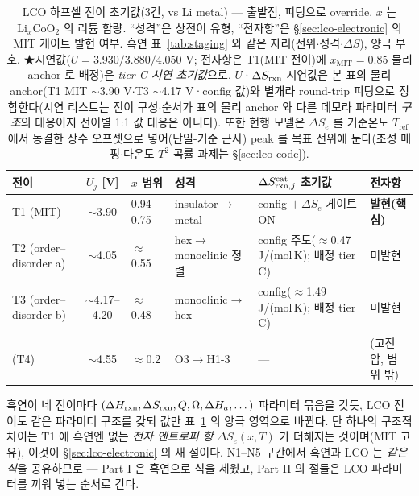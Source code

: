 \begin{table}[t]
\centering\footnotesize
\renewcommand{\arraystretch}{1.3}
\caption{LCO 하프셀 전이 초기값(3건, vs Li metal) --- 출발점, 피팅으로 override. $x$ 는
$\mathrm{Li}_x\mathrm{CoO_2}$ 의 리튬 함량. ``성격''은 상전이 유형, ``전자항''은 \S\ref{sec:lco-electronic} 의 MIT
게이트 발현 여부. 흑연 표~\ref{tab:staging} 와 같은 자리(전위$\cdot$성격$\cdot\Delta S$), 양극 부호.
★시연값($U{=}3.930/3.880/4.050$ V; 전자항은 T1(MIT 전이)에
$x_\mathrm{MIT}{=}0.85$ 물리 anchor 로 배정)은
\emph{tier-C 시연 초기값}으로, $U$·$\Delta S_{\mathrm{rxn}}$ 시연값은 본 표의 물리 anchor(T1 MIT $\sim$3.90 V$\cdot$T3 $\sim$4.17 V·config 값)와
별개라 round-trip 피팅으로 정합한다(시연 리스트는 전이 구성$\cdot$순서가 표의 물리 anchor 와 다른 데모라 파라미터 \emph{구조}의 대응이지 전이별 1:1 값 대응은 아니다). 또한 현행 모델은 $\Delta S_e$ 를 기준온도 $T_\mathrm{ref}$ 에서
동결한 상수 오프셋으로 넣어(단일-기준 근사) peak 를 목표 전위에 둔다(조성 매핑$\cdot$다온도 $T^2$ 곡률
과제는 \S\ref{sec:lco-code}).}
\label{tab:lco-staging}
\begin{tabular}{@{}p{} c p{} p{} p{} p{}@{}}
\toprule
전이 & $U_j$ [V] & $x$ 범위 & 성격 & $\Delta S_{\mathrm{rxn},j}^\mathrm{cat}$ 초기값 & 전자항 \\
\midrule
T1 (MIT)              & $\sim$3.90        & 0.94--0.75 & insulator$\to$metal       & config $+\,\Delta S_e$ 게이트 ON & \textbf{발현(핵심)} \\
T2 (order--disorder a)& $\sim$4.05        & $\approx$0.55 & hex$\to$monoclinic 정렬 & config 주도($\approx$0.47 J/(mol\,K); 배정 tier C) & 미발현 \\
T3 (order--disorder b)& $\sim$4.17--4.20  & $\approx$0.48 & monoclinic$\to$hex      & config($\approx$1.49 J/(mol\,K); 배정 tier C) & 미발현 \\
\midrule
(T4)                  & $\sim$4.55        & $\approx$0.2 & O3$\to$H1-3              & --- & (고전압, 범위 밖) \\
\bottomrule
\end{tabular}
\end{table}

흑연이 네 전이마다 $(\Delta H_{\mathrm{rxn}},\Delta S_{\mathrm{rxn}},Q,\Omega,\Delta H_a,\dots)$ 파라미터 묶음을 갖듯,
LCO 전이도 같은 파라미터 구조를 갖되 값만 표~\ref{tab:lco-staging} 의 양극 영역으로 바뀐다. 단 하나의 구조적 차이는 T1 에
흑연엔 없는 \emph{전자 엔트로피 항} $\Delta S_e(x,T)$ 가 더해지는 것이며(MIT 고유), 이것이 \S\ref{sec:lco-electronic}
의 새 절이다. N1--N5 구간에서 흑연과 LCO 는 \emph{같은 식}을 공유하므로 --- Part I 은 흑연으로 식을 세웠고,
Part II 의 절들은 LCO 파라미터를 끼워 넣는 순서로 간다.

